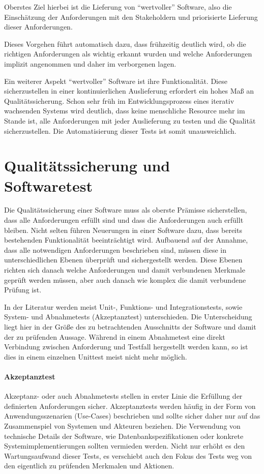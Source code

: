 Oberstes Ziel hierbei ist die Lieferung von ``wertvoller'' Software, also die Einschätzung der Anforderungen mit den Stakeholdern und priorisierte Lieferung dieser Anforderungen.

Dieses Vorgehen führt automatisch dazu, dass frühzeitig deutlich wird, ob die richtigen Anforderungen als wichtig erkannt wurden und welche Anforderungen implizit angenommen und daher im verborgenen lagen.

Ein weiterer Aspekt ``wertvoller'' Software ist ihre Funktionalität. Diese sicherzustellen in einer kontinuierlichen Auslieferung erfordert ein hohes Maß an Qualitätssicherung. Schon sehr früh im Entwicklungsprozess eines iterativ wachsenden Systems wird deutlich, dass keine menschliche Resource mehr im Stande ist, alle Anforderungen mit jeder Auslieferung zu testen und die Qualität sicherzustellen. Die Automatisierung dieser Tests ist somit unausweichlich.

\section{Qualitätssicherung und Softwaretest}

Die Qualitätssicherung einer Software muss als oberste Prämisse sicherstellen, dass alle Anforderungen erfüllt sind und dass die Anforderungen auch erfüllt bleiben. Nicht selten führen Neuerungen in einer Software dazu, dass bereits bestehenden Funktionalität beeinträchtigt wird. 
Aufbauend auf der Annahme, dass alle notwendigen Anforderungen beschrieben sind, müssen diese in unterschiedlichen Ebenen überprüft und sichergestellt werden.
Diese Ebenen richten sich danach welche Anforderungen und damit verbundenen Merkmale geprüft werden müssen, aber auch danach wie komplex die damit verbundene Prüfung ist.

In der Literatur werden meist Unit-, Funktions- und Integrationstests, sowie System- und Abnahmetests (Akzeptanztest) unterschieden.
Die Unterscheidung liegt hier in der Größe des zu betrachtenden Ausschnitts der Software und damit der zu prüfenden Aussage. Während in einem Abnahmetest eine direkt Verbindung zwischen Anforderung und Testfall hergestellt werden kann, so ist dies in einem einzelnen Unittest meist nicht mehr möglich.
\paragraph{Akzeptanztest}
Akzeptanz- oder auch Abnahmetests stellen in erster Linie die Erfüllung der definierten Anforderungen sicher. Akzeptanztests werden häufig in der Form von Anwendungsszenarien (Use-Cases) beschrieben und sollte sicher daher nur auf das Zusammenspiel von Systemen und Akteuren beziehen. Die Verwendung von technische Details der Software, wie Datenbankspezifikationen oder konkrete Systemimplementierungen sollten vermieden werden. Nicht nur erhöht es den Wartungsaufwand dieser Tests, es verschiebt auch den Fokus des Tests weg von den eigentlich zu prüfenden Merkmalen und Aktionen.


